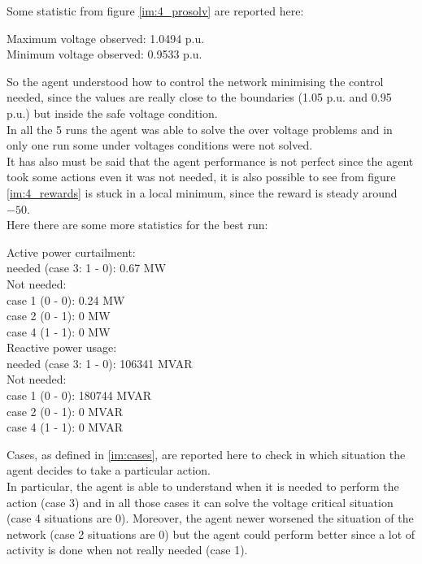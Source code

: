 \noindent Some statistic from figure \ref{im:4_prosolv} are  reported here:

\begin{algorithm}[h]
    \STATE Maximum voltage observed: 1.0494 p.u. \\
    \STATE Minimum voltage observed: 0.9533 p.u.
\end{algorithm}
\noindent So the agent understood how to control the network minimising the control needed, since the values are really close to the boundaries (1.05 p.u. and 0.95 p.u.) but inside the safe voltage condition.\\

In all the 5 runs the agent was able to solve the over voltage problems and in only one run some under voltages conditions were not solved.\\
It has also must be said that the agent performance is not perfect since the agent took some actions even it was not needed, it is also possible to see from figure \ref{im:4_rewards} is stuck in a local minimum, since the reward is steady around $-50$. \\

\noindent Here there are some more statistics for the best run:\\

\begin{algorithm}[h]
    \STATE Active power curtailment:\\
    \STATE needed (case 3: 1 - 0): 0.67 MW\\
    \STATE Not needed:\\
    \STATE case 1 (0 - 0): 0.24 MW\\
    \STATE case 2 (0 - 1): 0 MW\\
    \STATE case 4 (1 - 1): 0 MW\\
    
    \STATE Reactive power usage:\\
    \STATE needed (case 3: 1 - 0): 106341 MVAR\\
    \STATE Not needed:\\
    \STATE case 1 (0 - 0): 180744 MVAR\\
    \STATE case 2 (0 - 1): 0 MVAR\\
    \STATE case 4 (1 - 1): 0 MVAR
\label{alg:agentsucks}
\end{algorithm}
\noindent Cases, as defined in \ref{im:cases}, are reported here to check in which situation the agent decides to take a particular action.\\
In particular, the agent is able to understand when it is needed to perform the action (case 3) and in all those cases it can solve the voltage critical situation (case 4 situations are 0). Moreover, the agent newer worsened the situation of the network (case 2 situations are 0) but the agent could perform better since a lot of activity is done when not really needed (case 1).


